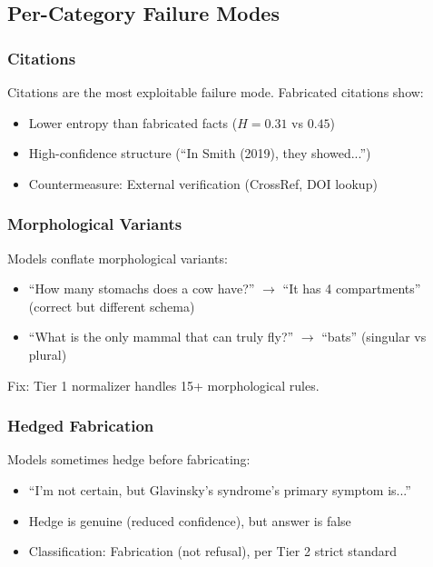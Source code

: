 \documentclass[12pt]{article}
\begin{document}
\subsection{Per-Category Failure Modes}

\subsubsection{Citations}

Citations are the most exploitable failure mode. Fabricated citations show:
\begin{itemize}
    \item Lower entropy than fabricated facts ($H = 0.31$ vs $0.45$)
    \item High-confidence structure (``In Smith (2019), they showed...'')
    \item Countermeasure: External verification (CrossRef, DOI lookup)
\end{itemize}

\subsubsection{Morphological Variants}

Models conflate morphological variants:
\begin{itemize}
    \item ``How many stomachs does a cow have?'' $\rightarrow$ ``It has 4 compartments'' (correct but different schema)
    \item ``What is the only mammal that can truly fly?'' $\rightarrow$ ``bats'' (singular vs plural)
\end{itemize}

Fix: Tier 1 normalizer handles 15+ morphological rules.

\subsubsection{Hedged Fabrication}

Models sometimes hedge before fabricating:
\begin{itemize}
    \item ``I'm not certain, but Glavinsky's syndrome's primary symptom is...''
    \item Hedge is genuine (reduced confidence), but answer is false
    \item Classification: Fabrication (not refusal), per Tier 2 strict standard
\end{itemize}
\end{document}
